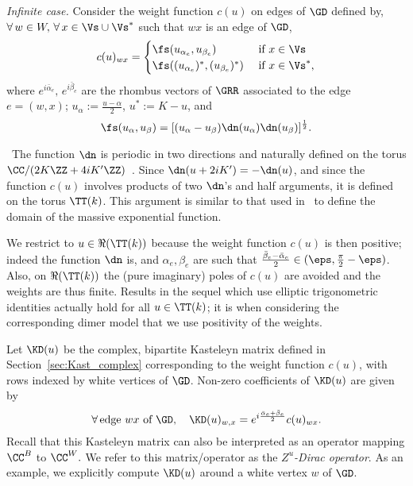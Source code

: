 \documentclass[a4paper,twoside,11pt]{article}
\begin{document}
\emph{Infinite case.}
Consider the weight function $c(u)$ on edges of $\GD$ defined by, $\forall\,w\in W,\,\forall\,x\in\Vs\cup\Vs^*$ such that 
$wx$ is an edge of $\GD$,
\begin{equation}\label{equ:defKD}
c(u)_{wx}=
\begin{cases}
\fs(u_{\alpha_e},u_{\beta_e})&\text{ if $x\in\Vs$}\\
\fs((u_{\alpha_e})^*,(u_{\beta_e})^*)&\text{ if $x\in\Vs^*$},
\end{cases}
\end{equation}
where $e^{i\bar{\alpha}_e},\,e^{i\bar{\beta}_e}$ are the rhombus vectors of $\GRR$ associated to the edge $e=(w,x)$;
$u_\alpha:=\frac{u-\alpha}{2}$, $u^*:=K-u$, and
\begin{equation*}
\fs(u_{\alpha},u_{\beta})= 
[\sc(u_{\alpha}-u_{\beta})\dn(u_{\alpha})\dn(u_{\beta})]^{\frac{1}{2}}.
\end{equation*}
\begin{rem}$\,$\label{rem:positivit_c}
The function $\dn$ is periodic in two directions and naturally defined on the torus $\CC/(2K\ZZ+4iK'\ZZ)$~\cite{AS}.
Since $\dn(u+2iK')=-\dn(u)$, and since the function $c(u)$ involves products of two $\dn$'s and half arguments, it is defined 
on the torus $\TT(k)$. This argument is similar to that used in~\cite{BdTR1} to define the domain of the massive exponential function.

We restrict to $u\in\Re(\TT(k))$ because the weight function $c(u)$ is then positive; indeed the function $\dn$ is, and 
$\alpha_e,\beta_e$ are such that
$\frac{\bar{\beta}_e-\bar{\alpha}_e}{2}\in(\eps,\frac{\pi}{2}-\eps)$. Also, on $\Re(\TT(k))$ the (pure imaginary) poles of $c(u)$ are 
avoided and the weights are thus finite.
Results in the sequel which use elliptic trigonometric identities 
actually hold for all $u\in\TT(k)$; it is when considering the corresponding dimer model that we use positivity of the weights.
\end{rem}

Let $\KD(u)$ be the complex, bipartite Kasteleyn matrix defined in Section~\ref{sec:Kast_complex} corresponding to the weight function $c(u)$, with rows indexed by 
white vertices of $\GD$. Non-zero coefficients of $\KD(u)$ are given by
\begin{equation}\label{equ:defKD_1}
\forall\,\text{edge $wx$ of $\GD$},\quad 
\KD(u)_{w,x}=
e^{i\frac{\bar{\alpha}_e+\bar{\beta}_e}{2}}c(u)_{wx}.
\end{equation}
Recall that this Kasteleyn matrix can also be interpreted as 
an operator mapping $\CC^B$ to $\CC^W.$ We refer to this matrix/operator as the \emph{$Z^u$-Dirac operator}. As an example, we 
explicitly compute $\KD(u)$ around a white vertex $w$ of $\GD$. 
\end{document}

